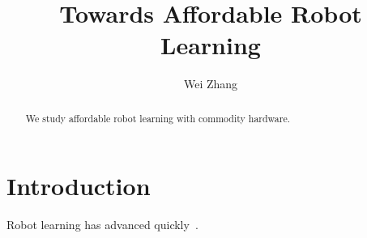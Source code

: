 \documentclass[sigconf]{acmart}
\title{Towards Affordable Robot Learning}
\author{Wei Zhang}
\affiliation{\institution{Tsinghua University}\city{Beijing}\country{China}}
\begin{document}
\begin{abstract}
We study affordable robot learning with commodity hardware.
\end{abstract}
\maketitle
\section{Introduction}
Robot learning has advanced quickly~\cite{smith2020}.


\end{document}
